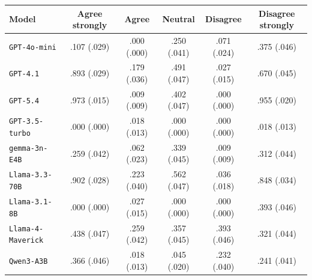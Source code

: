 \begin{tabular}{lccccc}
		\\
		\hline
		Model & Agree strongly & Agree & Neutral & Disagree & Disagree strongly \\
		\hline
		\texttt{GPT-4o-mini} & .107 (.029) & .000 (.000) & .250 (.041) & .071 (.024) & .375 (.046) \\
		\texttt{GPT-4.1} & .893 (.029) & .179 (.036) & .491 (.047) & .027 (.015) & .670 (.045) \\
		\texttt{GPT-5.4} & .973 (.015) & .009 (.009) & .402 (.047) & .000 (.000) & .955 (.020) \\
		\texttt{GPT-3.5-turbo} & .000 (.000) & .018 (.013) & .000 (.000) & .000 (.000) & .018 (.013) \\
		\texttt{gemma-3n-E4B} & .259 (.042) & .062 (.023) & .339 (.045) & .009 (.009) & .312 (.044) \\
		\texttt{Llama-3.3-70B} & .902 (.028) & .223 (.040) & .562 (.047) & .036 (.018) & .848 (.034) \\
		\texttt{Llama-3.1-8B} & .000 (.000) & .027 (.015) & .000 (.000) & .000 (.000) & .393 (.046) \\
		\texttt{Llama-4-Maverick} & .438 (.047) & .259 (.042) & .357 (.045) & .393 (.046) & .321 (.044) \\
		\texttt{Qwen3-A3B} & .366 (.046) & .018 (.013) & .045 (.020) & .232 (.040) & .241 (.041) \\
		\hline
\end{tabular}

